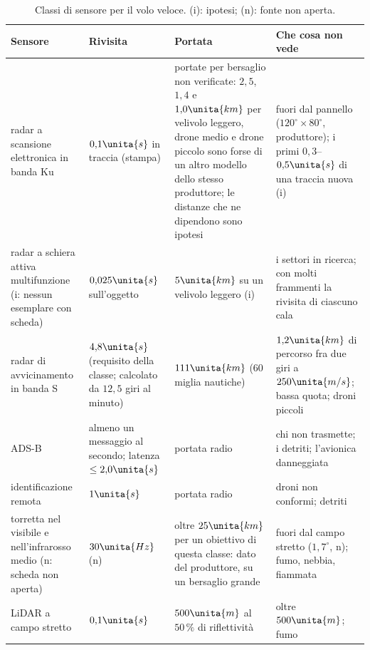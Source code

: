 \begin{table}[H]\centering\footnotesize
\caption{Classi di sensore per il volo veloce. (i): ipotesi; (n): fonte non aperta.}\label{tab:vo-sensori}
\begin{tabularx}{\linewidth}{@{}>{\RaggedRight\arraybackslash}p{4.0cm}>{\RaggedRight\arraybackslash}p{1.8cm}>{\RaggedRight\arraybackslash}p{3.8cm}L@{}}
\toprule
Sensore & Rivisita & Portata & Che cosa non vede\\
\midrule
radar a scansione elettronica in banda Ku \citep{echodyne-tradegov-2024,echodyne-echoshield-news,dronedj2026-echodyne} & $0{,}1\unita{s}$ in traccia (stampa) & portate per bersaglio non verificate: $2{,}5$, $1{,}4$ e $1{,}0\unita{km}$ per velivolo leggero, drone medio e drone piccolo sono forse di un altro modello dello stesso produttore; le distanze che ne dipendono sono ipotesi & fuori dal pannello ($120^\circ\times80^\circ$, produttore); i primi $0{,}3$--$0{,}5\unita{s}$ di una traccia nuova (i)\\
radar a schiera attiva multifunzione (i: nessun esemplare con scheda) & $0{,}025\unita{s}$ sull'oggetto & $5\unita{km}$ su un velivolo leggero (i) & i settori in ricerca; con molti frammenti la rivisita di ciascuno cala\\
radar di avvicinamento in banda S \citep{stone1989,wikipedia-asr11} & $4{,}8\unita{s}$ (requisito della classe; calcolato da $12{,}5$ giri al minuto) & $111\unita{km}$ ($60$ miglia nautiche) & $1{,}2\unita{km}$ di percorso fra due giri a $250\unita{m/s}$; bassa quota; droni piccoli\\
ADS-B \cite{cfr-91-227} & almeno un messaggio al secondo; latenza $\le2{,}0\unita{s}$ & portata radio & chi non trasmette; i detriti; l'avionica danneggiata\\
identificazione remota \cite{cfr-89-310} & $1\unita{s}$ & portata radio & droni non conformi; detriti\\
torretta nel visibile e nell'infrarosso medio (n: scheda non aperta) & $30\unita{Hz}$ (n) & oltre $25\unita{km}$ per un obiettivo di questa classe: dato del produttore, su un bersaglio grande \citep{ophir-supir-50-1350} & fuori dal campo stretto ($1{,}7^\circ$, n); fumo, nebbia, fiammata\\
LiDAR a campo stretto \cite{livox-tele15} & $0{,}1\unita{s}$ & $500\unita{m}$ al $50\,\%$ di riflettività & oltre $500\unita{m}$; fumo\\
\bottomrule
\end{tabularx}
\end{table}

